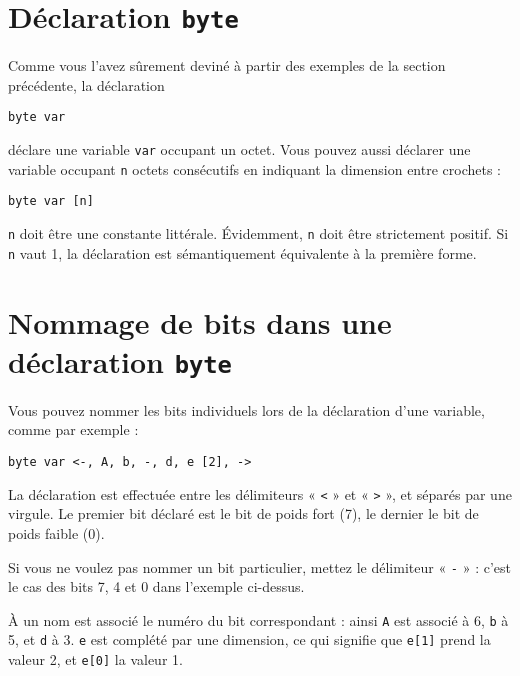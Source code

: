 \section{Déclaration \texttt{byte}}

Comme vous l’avez sûrement deviné à partir des exemples de la section précédente, la déclaration

\begin{lstlisting}[language=piccolo]
byte var 
\end{lstlisting}

déclare une variable \texttt{var} occupant un octet. Vous pouvez aussi déclarer une variable occupant \texttt{n} octets consécutifs en indiquant la dimension entre crochets :

\begin{lstlisting}[language=piccolo]
byte var [n]
\end{lstlisting}

\texttt{n} doit être une constante littérale. Évidemment, \texttt{n} doit être strictement positif. Si \texttt{n} vaut 1, la déclaration est sémantiquement équivalente à la première forme.






\section{Nommage de bits dans une déclaration \texttt{byte}}

Vous pouvez nommer les bits individuels lors de la déclaration d’une variable, comme par exemple :

\begin{lstlisting}[language=piccolo]
byte var <-, A, b, -, d, e [2], ->
\end{lstlisting}

La déclaration est effectuée entre les délimiteurs « \texttt{<} » et « \texttt{>} », et séparés par une virgule. Le premier bit déclaré est le bit de poids fort (7), le dernier le bit de poids faible (0).

Si vous ne voulez pas nommer un bit particulier, mettez le délimiteur « \texttt{-} » : c’est le cas des bits 7, 4 et 0 dans l’exemple ci-dessus.

À un nom est associé le numéro du bit correspondant : ainsi \texttt{A} est associé à 6, \texttt{b} à 5, et \texttt{d} à 3. \texttt{e} est complété par une dimension, ce qui signifie que \texttt{e[1]} prend la valeur 2, et \texttt{e[0]} la valeur 1.

